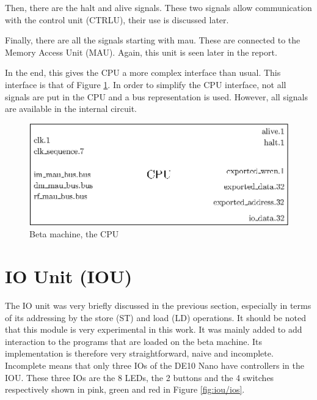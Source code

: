 Then, there are the halt and alive signals. These two signals allow communication with the control 
unit (CTRLU), their use is discussed later.

Finally, there are all the signals starting with mau. These are connected to the Memory Access Unit 
(MAU). Again, this unit is seen later in the report. 

In the end, this gives the CPU a more complex interface than usual. This interface is that of 
Figure \ref{fig:beta/interface}. In order to simplify the CPU interface, not all signals are put in 
the CPU and a bus representation is used. However, all signals are available in the internal circuit.

\begin{figure}[H]
    \centering
    \includegraphics[scale=0.8]{Chapter3-CPU/res/beta_machine}
    \caption{Beta machine, the CPU}
    \label{fig:beta/interface}
\end{figure}

\section{IO Unit (IOU)}

The IO unit was very briefly discussed in the previous section, especially in terms of its 
addressing by the store (ST) and load (LD) operations. It should be noted that this module is 
very experimental in this work. It was mainly added to add interaction to the programs that 
are loaded on the beta machine. Its implementation is therefore very straightforward, naive and 
incomplete. Incomplete means that only three IOs of the DE10 Nano have controllers in the IOU. 
These three IOs are the 8 LEDs, the 2 buttons and the 4 switches respectively shown in pink, green
and red in Figure \ref{fig:iou/ios}.

